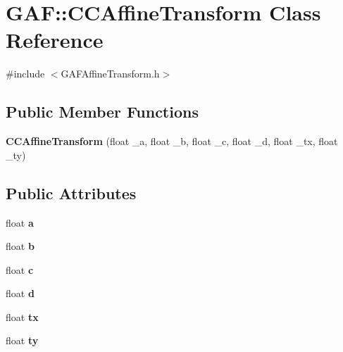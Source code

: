 \hypertarget{class_g_a_f_1_1_c_c_affine_transform}{\section{G\-A\-F\-:\-:C\-C\-Affine\-Transform Class Reference}
\label{class_g_a_f_1_1_c_c_affine_transform}
}


{\ttfamily \#include $<$G\-A\-F\-Affine\-Transform.\-h$>$}

\subsection*{Public Member Functions}
\begin{DoxyCompactItemize}
\item 
\hypertarget{class_g_a_f_1_1_c_c_affine_transform_ac8139f6b3b54044a1c72a0c444ea8414}{{\bfseries C\-C\-Affine\-Transform} (float \-\_\-a, float \-\_\-b, float \-\_\-c, float \-\_\-d, float \-\_\-tx, float \-\_\-ty)}\label{class_g_a_f_1_1_c_c_affine_transform_ac8139f6b3b54044a1c72a0c444ea8414}

\end{DoxyCompactItemize}
\subsection*{Public Attributes}
\begin{DoxyCompactItemize}
\item 
\hypertarget{class_g_a_f_1_1_c_c_affine_transform_a1cbd5f3c9d4794f4f49e774d8ae947d1}{float {\bfseries a}}\label{class_g_a_f_1_1_c_c_affine_transform_a1cbd5f3c9d4794f4f49e774d8ae947d1}

\item 
\hypertarget{class_g_a_f_1_1_c_c_affine_transform_a7b90cb5f5c8e10849f1707480b3569c8}{float {\bfseries b}}\label{class_g_a_f_1_1_c_c_affine_transform_a7b90cb5f5c8e10849f1707480b3569c8}

\item 
\hypertarget{class_g_a_f_1_1_c_c_affine_transform_a9ac696a9d4da17e0ed66d42a2f2dfc20}{float {\bfseries c}}\label{class_g_a_f_1_1_c_c_affine_transform_a9ac696a9d4da17e0ed66d42a2f2dfc20}

\item 
\hypertarget{class_g_a_f_1_1_c_c_affine_transform_aa8e40fed303ec3ef8a968efe977cb2ba}{float {\bfseries d}}\label{class_g_a_f_1_1_c_c_affine_transform_aa8e40fed303ec3ef8a968efe977cb2ba}

\item 
\hypertarget{class_g_a_f_1_1_c_c_affine_transform_a48d1ac3c3edf0ef5e73aa1668a03c49a}{float {\bfseries tx}}\label{class_g_a_f_1_1_c_c_affine_transform_a48d1ac3c3edf0ef5e73aa1668a03c49a}

\item 
\hypertarget{class_g_a_f_1_1_c_c_affine_transform_a62287c605f0ae590130bebd8c652f290}{float {\bfseries ty}}\label{class_g_a_f_1_1_c_c_affine_transform_a62287c605f0ae590130bebd8c652f290}

\end{DoxyCompactItemize}


